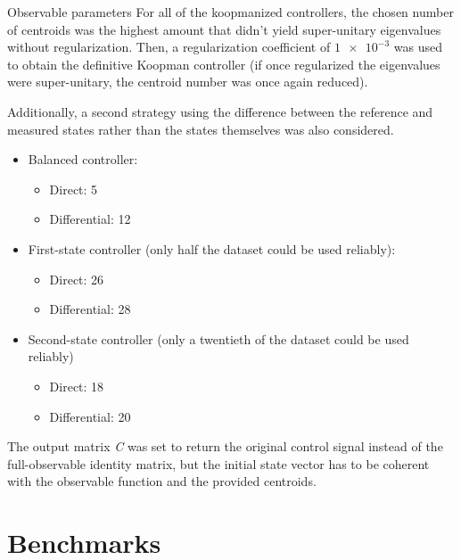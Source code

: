 \documentclass{beamer}
\begin{document}
\begin{frame}[allowframebreaks]{Observable parameters}
    For all of the koopmanized controllers, the chosen number of centroids was the highest amount that didn't yield super-unitary eigenvalues without regularization. Then, a regularization coefficient of $\num{1e-3}$ was used to obtain the definitive Koopman controller (if once regularized the eigenvalues were super-unitary, the centroid number was once again reduced).

    Additionally, a second strategy using the difference between the reference and measured states rather than the states themselves was also considered.

    \begin{itemize}
        \item Balanced controller:
            \begin{itemize}
                \item Direct: 5
                \item Differential: 12
            \end{itemize}
        \item First-state controller (only half the dataset could be used reliably):
            \begin{itemize}
                \item Direct: 26
                \item Differential: 28
            \end{itemize}
        \item Second-state controller (only a twentieth of the dataset could be used reliably)
            \begin{itemize}
                \item Direct: 18
                \item Differential: 20
            \end{itemize}
    \end{itemize}

    The output matrix \textit{C} was set to return the original control signal instead of the full-observable identity matrix, but the initial state vector has to be coherent with the observable function and the provided centroids.
\end{frame}


\section{Benchmarks}
\end{document}
